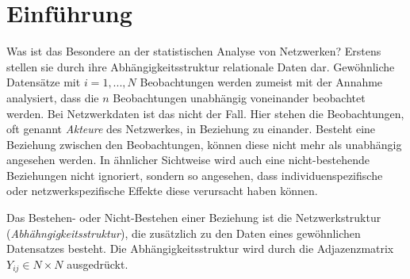 \documentclass[a4paper,ngerman,oneside,titlepage,bibliography=totoc,11pt]{scrreprt}
\begin{document}
\begin{abstract}


\begin{center}
{\it \bf Abstract} 
\end{center}
Dieser Bericht behandelt die Analyse der \emph{NISAT database of transfers of small arms, light weapons, and their ammunition, parts and accessories}. Die Netzwerkdaten stellen das internationale Kleinwaffenhandelsnetzwerk im Zeitraum 1992 bis 2011 dar.

Nachdem die Datengrundlage besprochen wird, erfolgt eine deskriptive Analyse des Handelsnetzwerkes anhand Zeitreihen von Netzwerkstatistiken. Im zweiten Teil wird der Querschnitt des Netzwerkes Jahr für Jahr anhand von ERGMs modelliert, um charakteristische Strukturen des Netzwerkes aufzudecken. Der Fokus liegt hierbei auf der Selektion interner Netzwerkstatistiken sowie externer Kovariablen.
 \\
 
 {\bf Schlagwörter}

\end{abstract}




\tableofcontents




\chapter{Einführung}

Was ist das Besondere an der statistischen Analyse von Netzwerken? Erstens stellen sie durch ihre Abhängigkeitsstruktur relationale Daten dar. Gewöhnliche Datensätze mit $i = 1, ..., N$ Beobachtungen werden zumeist mit der Annahme analysiert, dass die $n$ Beobachtungen unabhängig voneinander beobachtet werden. Bei Netzwerkdaten ist das nicht der Fall. Hier stehen die Beobachtungen, oft genannt \emph{Akteure} des Netzwerkes, in Beziehung zu einander. Besteht eine Beziehung zwischen den Beobachtungen, können diese nicht mehr als unabhängig angesehen werden. In ähnlicher Sichtweise wird auch eine nicht-bestehende Beziehungen nicht ignoriert, sondern so angesehen, dass individuenspezifische oder netzwerkspezifische Effekte diese verursacht haben können.

Das Bestehen- oder Nicht-Bestehen einer Beziehung ist die Netzwerkstruktur (\emph{Abhähngigkeitsstruktur}), die zusätzlich zu den Daten eines gewöhnlichen Datensatzes besteht. Die Abhängigkeitsstruktur wird durch die Adjazenzmatrix $Y_{ij} \in N \times N$ ausgedrückt.
\end{document}
